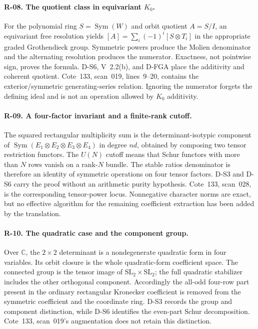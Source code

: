 \paragraph{R-08. The quotient class in equivariant $K_0$.}
For the polynomial ring $S=\operatorname{Sym}(W)$ and orbit quotient $A=S/I$, an equivariant free resolution yields $[A]=\sum_i(-1)^i[S\otimes T_i]$ in the appropriate graded Grothendieck group. Symmetric powers produce the Molien denominator and the alternating resolution produces the numerator. Exactness, not pointwise sign, proves the formula. D-S6, V~2.2(b), and D-FGA place the additivity and coherent quotient. Cote~133, scan~019, lines~9--20, contains the exterior/symmetric generating-series relation. Ignoring the numerator forgets the defining ideal and is not an operation allowed by $K_0$ additivity.

\paragraph{R-09. A four-factor invariant and a finite-rank cutoff.}
The squared rectangular multiplicity sum is the determinant-isotypic component of $\operatorname{Sym}(E_1\otimes E_2\otimes E_3\otimes E_4)$ in degree $nd$, obtained by composing two tensor restriction functors. The $U(N)$ cutoff means that Schur functors with more than $N$ rows vanish on a rank-$N$ bundle. The stable ratios denominator is therefore an identity of symmetric operations on four tensor factors. D-S3 and D-S6 carry the proof without an arithmetic purity hypothesis. Cote~133, scan~028, is the corresponding tensor-power locus. Nonnegative character norms are exact, but no effective algorithm for the remaining coefficient extraction has been added by the translation.

\paragraph{R-10. The quadratic case and the component group.}
Over $\mathbb C$, the $2\times2$ determinant is a nondegenerate quadratic form in four variables. Its orbit closure is the whole quadratic-form coefficient space. The connected group is the tensor image of $\mathrm{SL}_2\times\mathrm{SL}_2$; the full quadratic stabilizer includes the other orthogonal component. Accordingly the all-odd four-row part present in the ordinary rectangular Kronecker coefficient is removed from the symmetric coefficient and the coordinate ring. D-S3 records the group and component distinction, while D-S6 identifies the even-part Schur decomposition. Cote~133, scan~019's augmentation does not retain this distinction.

